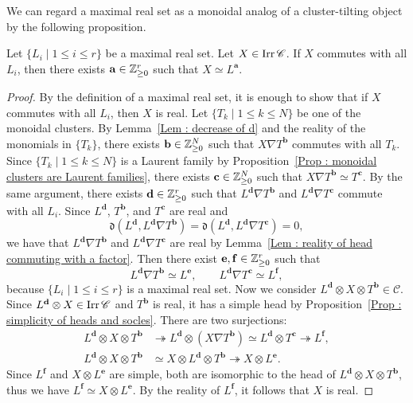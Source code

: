 We can regard a maximal real set as a monoidal analog
of a cluster-tilting object by the following proposition.

\begin{Prop}
\label{Prop : simple modules commuting with a maximal real set}
Let $\{L_i \mid 1 \leq i \leq r\}$ be a maximal real set.
Let $X \in \mathop{\mathrm{Irr}}\nolimits\mathscr{C}$.
If $X$ commutes with all $L_i$,
then there exists $\mathbf{a} \in \mathbb{Z}_{\geq 0}^r$
such that $X \simeq L^{\mathbf{a}}$.
\end{Prop}

\begin{proof}
By the definition of a maximal real set,
it is enough to show that if $X$ commutes with all $L_i$,
then $X$ is real.
Let $\{T_k \mid 1 \leq k \leq N\}$ be one of the monoidal clusters.
By Lemma~\ref{Lem : decrease of d}
and the reality of the monomials in $\{T_k\}$,
there exists $\mathbf{b} \in \mathbb{Z}_{\geq 0}^N$ such that
$X \nabla T^{\mathbf{b}}$ commutes with all $T_k$.
Since $\{T_k \mid 1 \leq k \leq N\}$ is a Laurent family
by Proposition~\ref{Prop : monoidal clusters are Laurent families},
there exists $\mathbf{c} \in \mathbb{Z}_{\geq 0}^N$ such that
$X \nabla T^{\mathbf{b}} \simeq T^{\mathbf{c}}$.
By the same argument, there exists $\mathbf{d} \in \mathbb{Z}_{\geq 0}^r$
such that $L^{\mathbf{d}} \nabla T^{\mathbf{b}}$ and
$L^{\mathbf{d}} \nabla T^{\mathbf{c}}$ commute with all $L_i$.
Since $L^{\mathbf{d}}$, $T^{\mathbf{b}}$, and $T^{\mathbf{c}}$
are real and
\[
\mathfrak{d}(L^{\mathbf{d}},
L^{\mathbf{d}} \nabla T^{\mathbf{b}})
= \mathfrak{d}(L^{\mathbf{d}},
L^{\mathbf{d}} \nabla T^{\mathbf{c}}) = 0,
\]
we have that $L^{\mathbf{d}} \nabla T^{\mathbf{b}}$ and
$L^{\mathbf{d}} \nabla T^{\mathbf{c}}$ are real
by Lemma~\ref{Lem : reality of head commuting with a factor}.
Then there exist $\mathbf{e}, \mathbf{f} \in \mathbb{Z}_{\geq 0}^r$
such that
\[
L^{\mathbf{d}} \nabla T^{\mathbf{b}} \simeq L^{\mathbf{e}},
\qquad
L^{\mathbf{d}} \nabla T^{\mathbf{c}} \simeq L^{\mathbf{f}},
\]
because $\{L_i \mid 1 \leq i \leq r\}$ is a maximal real set.
Now we consider
$L^{\mathbf{d}} \otimes X \otimes T^{\mathbf{b}} \in \mathscr{C}$.
Since $L^{\mathbf{d}} \otimes X \in \mathop{\mathrm{Irr}}\nolimits\mathscr{C}$
and $T^{\mathbf{b}}$ is real,
it has a simple head by
Proposition~\ref{Prop : simplicity of heads and socles}.
There are two surjections:
\[
\begin{aligned}
L^{\mathbf{d}} \otimes X \otimes T^{\mathbf{b}}
&\twoheadrightarrow
L^{\mathbf{d}} \otimes (X \nabla T^{\mathbf{b}})
\simeq L^{\mathbf{d}} \otimes T^{\mathbf{c}}
\twoheadrightarrow L^{\mathbf{f}}, \\
L^{\mathbf{d}} \otimes X \otimes T^{\mathbf{b}}
&\simeq X \otimes L^{\mathbf{d}} \otimes T^{\mathbf{b}}
\twoheadrightarrow X \otimes L^{\mathbf{e}}.
\end{aligned}
\]
Since $L^{\mathbf{f}}$ and $X \otimes L^{\mathbf{e}}$ are simple,
both are isomorphic to the head of
$L^{\mathbf{d}} \otimes X \otimes T^{\mathbf{b}}$,
thus we have $L^{\mathbf{f}} \simeq X \otimes L^{\mathbf{e}}$.
By the reality of $L^{\mathbf{f}}$, it follows that $X$ is real.
\end{proof}

